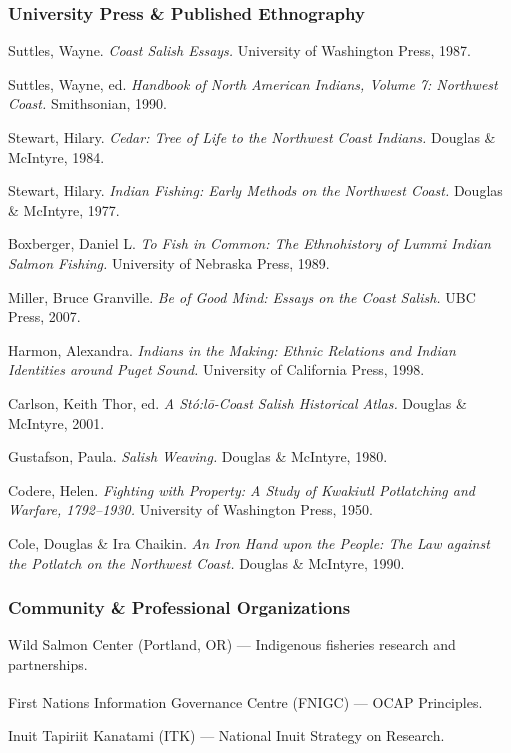 \documentclass[11pt,letterpaper]{article}
\begin{document}
\subsubsection{University Press \& Published Ethnography}

Suttles, Wayne. \textit{Coast Salish Essays.} University of Washington Press, 1987.

Suttles, Wayne, ed. \textit{Handbook of North American Indians, Volume 7: Northwest Coast.} Smithsonian, 1990.

Stewart, Hilary. \textit{Cedar: Tree of Life to the Northwest Coast Indians.} Douglas \& McIntyre, 1984.

Stewart, Hilary. \textit{Indian Fishing: Early Methods on the Northwest Coast.} Douglas \& McIntyre, 1977.

Boxberger, Daniel L. \textit{To Fish in Common: The Ethnohistory of Lummi Indian Salmon Fishing.} University of Nebraska Press, 1989.

Miller, Bruce Granville. \textit{Be of Good Mind: Essays on the Coast Salish.} UBC Press, 2007.

Harmon, Alexandra. \textit{Indians in the Making: Ethnic Relations and Indian Identities around Puget Sound.} University of California Press, 1998.

Carlson, Keith Thor, ed. \textit{A Stó:lō-Coast Salish Historical Atlas.} Douglas \& McIntyre, 2001.

Gustafson, Paula. \textit{Salish Weaving.} Douglas \& McIntyre, 1980.

Codere, Helen. \textit{Fighting with Property: A Study of Kwakiutl Potlatching and Warfare, 1792--1930.} University of Washington Press, 1950.

Cole, Douglas \& Ira Chaikin. \textit{An Iron Hand upon the People: The Law against the Potlatch on the Northwest Coast.} Douglas \& McIntyre, 1990.

\subsubsection{Community \& Professional Organizations}

Wild Salmon Center (Portland, OR) --- Indigenous fisheries research and partnerships.

First Nations Information Governance Centre (FNIGC) --- OCAP\textsuperscript{\textregistered} Principles.

Inuit Tapiriit Kanatami (ITK) --- National Inuit Strategy on Research.
\end{document}
